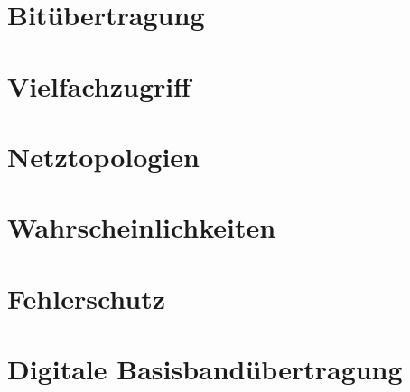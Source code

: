 \documentclass{scrreprt}
\begin{document}
\chapter{Bitübertragung}


\chapter{Vielfachzugriff}


\chapter{Netztopologien}


\chapter{Wahrscheinlichkeiten}


\chapter{Fehlerschutz}


\chapter{Digitale Basisbandübertragung}


\end{document}
